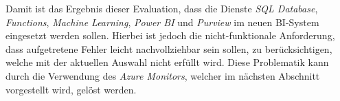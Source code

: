 Damit ist das Ergebnis dieser Evaluation, dass die Dienste \textit{SQL Database}, \textit{Functions}, \textit{Machine Learning}, \textit{Power BI} und \textit{Purview} im neuen BI-System eingesetzt werden sollen. Hierbei ist jedoch die nicht-funktionale Anforderung, dass aufgetretene Fehler leicht nachvollziehbar sein sollen, zu berücksichtigen, welche mit der aktuellen Auswahl nicht erfüllt wird. Diese Problematik kann durch die Verwendung des \textit{Azure Monitors}, welcher im nächsten Abschnitt vorgestellt wird, gelöst werden.



